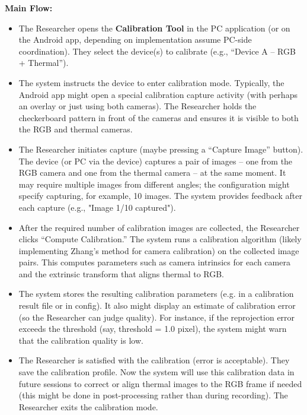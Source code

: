 \textbf{Main Flow:}
\begin{itemize}
    \item The Researcher opens the \textbf{Calibration Tool} in the PC application (or on the Android app, depending on implementation \textemdash assume PC-side coordination). They select the device(s) to calibrate (e.g., ``Device A -- RGB + Thermal'').
    \item The system instructs the device to enter calibration mode. Typically, the Android app might open a special calibration capture activity (with perhaps an overlay or just using both cameras). The Researcher holds the checkerboard pattern in front of the cameras and ensures it is visible to both the RGB and thermal cameras.
    \item The Researcher initiates capture (maybe pressing a ``Capture Image'' button). The device (or PC via the device) captures a pair of images -- one from the RGB camera and one from the thermal camera -- at the same moment. It may require multiple images from different angles; the configuration might specify capturing, for example, 10 images. The system provides feedback after each capture (e.g., "Image 1/10 captured").
    \item After the required number of calibration images are collected, the Researcher clicks ``Compute Calibration.'' The system runs a calibration algorithm (likely implementing Zhang's method for camera calibration) on the collected image pairs. This computes parameters such as camera intrinsics for each camera and the extrinsic transform that aligns thermal to RGB.
    \item The system stores the resulting calibration parameters (e.g. in a calibration result file or in config). It also might display an estimate of calibration error (so the Researcher can judge quality). For instance, if the reprojection error exceeds the threshold (say, threshold = 1.0 pixel), the system might warn that the calibration quality is low.
    \item The Researcher is satisfied with the calibration (error is acceptable). They save the calibration profile. Now the system will use this calibration data in future sessions to correct or align thermal images to the RGB frame if needed (this might be done in post-processing rather than during recording). The Researcher exits the calibration mode.
\end{itemize}

